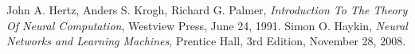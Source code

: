 \documentclass[10pt,a4paper]{article}
\begin{document}
\subtitulo{}


\grupo{}


\maketitle


\newpage


\newpage


\newpage


\newpage


\newpage



\begin{thebibliography}{9}
    John A. Hertz, Anders S. Krogh, Richard G. Palmer,
    \emph{Introduction To The Theory Of Neural Computation},
    Westview Press,
    June 24, 1991.
    Simon O. Haykin,
    \emph{Neural Networks and Learning Machines},
    Prentice Hall,
    3rd Edition,
    November 28, 2008.
\end{thebibliography}
\end{document}
